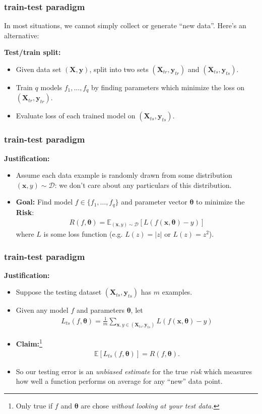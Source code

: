 \documentclass[handout,compress]{beamer}
\newcommand{\bs}[1]{\boldsymbol{#1}}
\newcommand{\bv}[1]{\mathbf{#1}}
\newcommand{\E}{\mathbb{E}}
\begin{document}
\begin{frame}
	\frametitle{train-test paradigm}
	 In most situations, we cannot simply collect or generate ``new data''. Here's an alternative:
	 
	 \textbf{Test/train split:}
	 \small
	\begin{itemize}
		\item Given data set $(\bv{X}, \bv{y})$, split into two sets $(\bv{X}_{tr}, \bv{y}_{tr})$ and $(\bv{X}_{ts}, \bv{y}_{ts})$.
		\item Train $q$ models $f_1, \ldots, f_q$ by finding parameters which minimize the loss on $(\bv{X}_{tr}, \bv{y}_{tr})$.
		\item Evaluate loss of each trained model on $(\bv{X}_{ts}, \bv{y}_{ts})$.
	\end{itemize}
\end{frame}

\begin{frame}
	\frametitle{train-test paradigm}
	\small
	\textbf{Justification:}
	\begin{itemize}
		\item Assume each data example is randomly drawn from some distribution $(\bv{x},y)\sim \mathcal{D}$: we don't care about any particulars of this distribution.
		\item \textbf{Goal:} Find model $f \in \{f_1, \ldots, f_q\}$ and parameter vector $\bs{\theta}$ to minimize the \alert{\textbf{Risk}}:
		\begin{align*}
			R(f,\bs{\theta}) = \E_{(\bv{x},y)\sim\mathcal{D}} \left[L\left(f(\bv{x},\bs{\theta}) - y\right) \right]
		\end{align*}
		where $L$ is some loss function (e.g. $L(z) = |z|$ or $L(z) = z^2$).
	\end{itemize}
\end{frame}

\begin{frame}
	\frametitle{train-test paradigm}
	\small
	\textbf{Justification:}
	\begin{itemize}
		\item Suppose the testing dataset $(\bv{X}_{ts}, \bv{y}_{ts})$ has $m$ examples.
		\item Given any model $f$ and parameters $\bs{\theta}$, let 
		\begin{align*}
			L_{ts}(f,\bs{\theta}) = \frac{1}{m}\sum_{\bv{x},y \in (\bv{X}_{ts}, \bv{y}_{ts})} L\left(f(\bv{x},\bs{\theta}) - y\right)
		\end{align*}
		\item \textbf{Claim:}\footnote{Only true if $f$ and $\bs{\theta}$ are chose \textit{without looking at your test data.}}
		\begin{align*}
		\E\left[L_{ts}(f,\bs{\theta})\right] = R(f,\bs{\theta}).
		\end{align*}
		\item So our testing error is an \emph{unbiased estimate} for the true \emph{risk} which measures how well a function performs on average for any ``new'' data point.
	\end{itemize}
\vspace{1em}
\end{frame}
\end{document}
